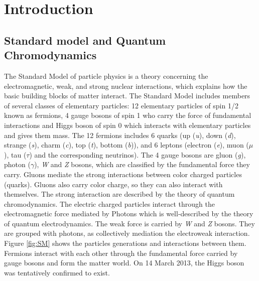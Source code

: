 %

\chapter{Introduction}


\section{Standard model and Quantum Chromodynamics}

The Standard Model of particle physics is a theory concerning the
electromagnetic, weak, and strong nuclear interactions, which explains
how the basic building blocks of matter interact. The Standard Model
includes members of several classes of elementary particles: 12 elementary
particles of spin 1/2 known as fermions, 4 gauge bosons of spin 1
who carry the force of fundamental interactions and Higgs boson of
spin 0 which interacts with elementary particles and gives them mass.
The 12 fermions includes 6 quarks (up (\emph{u}), down (\emph{d}),
strange (\emph{s}), charm (\emph{c}), top (\emph{t}), bottom (\emph{b})),
and 6 leptons (electron (\emph{e}), muon ($\mu$), tau ($\tau$) and
the corresponding neutrinos). The 4 gauge bosons are gluon (\emph{g}),
photon ($\gamma$), \emph{W} and \emph{Z} bosons, which are classified
by the fundamental force they carry. Gluons mediate the strong interactions
between color charged particles (quarks). Gluons also carry color
charge, so they can also interact with themselves. The strong interaction
are described by the theory of quantum chromodynamics. The electric
charged particles interact through the electromagnetic force mediated
by Photons which is well-described by the theory of quantum electrodynamics.
The weak force is carried by \emph{W} and \emph{Z} bosons. They are
grouped with photons, as collectively mediation the electroweak interaction.
Figure \ref{fig:SM} shows the particles generations and interactions
between them. Fermions interact with each other through the fundamental
force carried by gauge bosons and form the matter world. On 14 March
2013, the Higgs boson was tentatively confirmed to exist. 

